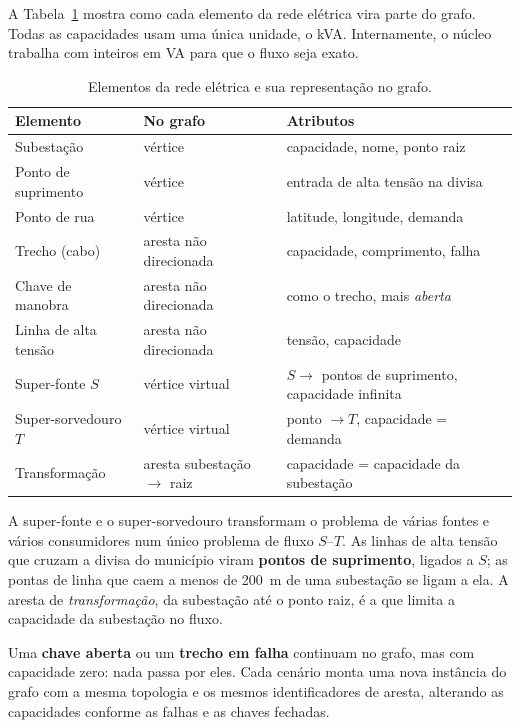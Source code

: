 \documentclass[12pt]{article}
\begin{document}
A Tabela~\ref{tab:modelo} mostra como cada elemento da rede elétrica vira parte do grafo. Todas as capacidades usam uma única unidade, o kVA. Internamente, o núcleo trabalha com inteiros em VA para que o fluxo seja exato.

\begin{table}[ht]
\centering
\caption{Elementos da rede elétrica e sua representação no grafo.}
\label{tab:modelo}
\begin{tabularx}{\textwidth}{lXX}
\toprule
\textbf{Elemento} & \textbf{No grafo} & \textbf{Atributos} \\
\midrule
Subestação & vértice & capacidade, nome, ponto raiz \\
Ponto de suprimento & vértice & entrada de alta tensão na divisa \\
Ponto de rua & vértice & latitude, longitude, demanda \\
Trecho (cabo) & aresta não direcionada & capacidade, comprimento, falha \\
Chave de manobra & aresta não direcionada & como o trecho, mais \emph{aberta} \\
Linha de alta tensão & aresta não direcionada & tensão, capacidade \\
Super-fonte $S$ & vértice virtual & $S \to$ pontos de suprimento, capacidade infinita \\
Super-sorvedouro $T$ & vértice virtual & ponto $\to T$, capacidade = demanda \\
Transformação & aresta subestação $\to$ raiz & capacidade = capacidade da subestação \\
\bottomrule
\end{tabularx}
\end{table}

A super-fonte e o super-sorvedouro transformam o problema de várias fontes e vários consumidores num único problema de fluxo $S$--$T$. As linhas de alta tensão que cruzam a divisa do município viram \textbf{pontos de suprimento}, ligados a $S$; as pontas de linha que caem a menos de 200~m de uma subestação se ligam a ela. A aresta de \emph{transformação}, da subestação até o ponto raiz, é a que limita a capacidade da subestação no fluxo.

Uma \textbf{chave aberta} ou um \textbf{trecho em falha} continuam no grafo, mas com capacidade zero: nada passa por eles. Cada cenário monta uma nova instância do grafo com a mesma topologia e os mesmos identificadores de aresta, alterando as capacidades conforme as falhas e as chaves fechadas.
\end{document}
